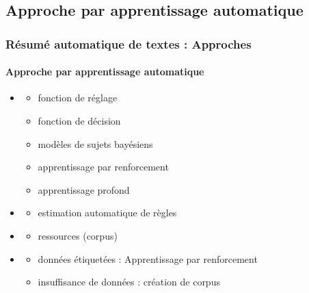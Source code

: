 \documentclass[xcolor=table]{beamer}
\begin{document}
\subsection{Approche par apprentissage automatique} 

\begin{frame}
\frametitle{Résumé automatique de textes : Approches}
\framesubtitle{Approche par apprentissage automatique}
	
\begin{itemize}
	\item {}
	\vspace{-.5cm}
	\begin{multicols}{3}
		\begin{itemize}
			\item fonction de réglage
			\item fonction de décision
			\item modèles de sujets bayésiens
			\item apprentissage par renforcement
			\item apprentissage profond
		\end{itemize}
	\end{multicols}
	
	\item {}
	\vspace{-.5cm}
	\begin{multicols}{1}
		\begin{itemize}
			\item estimation automatique de règles
		\end{itemize}
	\end{multicols}
	
	\item {}
	\vspace{-.5cm}
	\begin{multicols}{1}
		\begin{itemize}
			\item ressources (corpus)
		\end{itemize}
	\end{multicols}
	
	\item {}
	\begin{itemize}
		\item données étiquetées : Apprentissage par renforcement
		\item insuffisance de données : création de corpus
	\end{itemize}
	
\end{itemize}

\end{frame}
\end{document}
